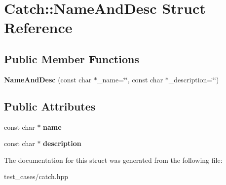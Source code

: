 \hypertarget{structCatch_1_1NameAndDesc}{}\section{Catch\+:\+:Name\+And\+Desc Struct Reference}
\label{structCatch_1_1NameAndDesc}
\subsection*{Public Member Functions}
\begin{DoxyCompactItemize}
\item 
\mbox{\label{structCatch_1_1NameAndDesc_a189ceb9942fb5f6635140d6a09fc843a}} 
{\bfseries Name\+And\+Desc} (const char $\ast$\+\_\+name=\char`\"{}\char`\"{}, const char $\ast$\+\_\+description=\char`\"{}\char`\"{})
\end{DoxyCompactItemize}
\subsection*{Public Attributes}
\begin{DoxyCompactItemize}
\item 
\mbox{\label{structCatch_1_1NameAndDesc_a374b4ed8be3cf98be20ebde5273bde51}} 
const char $\ast$ {\bfseries name}
\item 
\mbox{\label{structCatch_1_1NameAndDesc_a3463a23ff65ce494fc380452b57b7970}} 
const char $\ast$ {\bfseries description}
\end{DoxyCompactItemize}


The documentation for this struct was generated from the following file\+:\begin{DoxyCompactItemize}
\item 
test\+\_\+cases/catch.\+hpp\end{DoxyCompactItemize}

